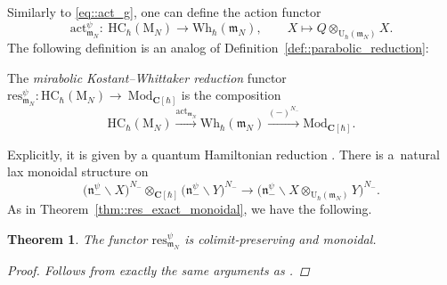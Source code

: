 \documentclass[10pt,a4paper]{article}
\numberwithin{equation}{section}
\newtheorem{Theorem}{Theorem}[section]
\newcommand{\C}{\mathbf{C}}
\newcommand{\U}{\mathrm{U}_{\hbar}}
\newcommand{\rM}{\mathrm{M}}
\newcommand{\n}{\mathfrak{n}}
\newcommand{\m}{\mathfrak{m}}
\newcommand{\Wh}{\mathrm{Wh}_{\hbar}}
\newcommand{\act}{\mathrm{act}}
\newcommand{\Mod}[1]{{\mathrm{Mod}}_{#1}}
\newcommand{\HC}{\mathrm{HC}_{\hbar}}
\newcommand{\res}{\mathrm{res}}
\begin{document}
	Similarly to \eqref{eq::act_g}, one can define the action functor
	\[
	\act_{\m_N}^{\psi}\colon\ \HC(\rM_N) \rightarrow \Wh(\m_N), \qquad X \mapsto Q \otimes_{\U(\m_N)} X.
	\]
	The following definition is an analog of Definition~\ref{def::parabolic_reduction}:
	\begin{Definition}
		The \emph{mirabolic Kostant--Whittaker reduction} functor $\res_{\m_N}^{\psi}  \colon  \HC(\rM_N)  \rightarrow \ \allowbreak\Mod{\C[\hbar]}$ is the composition
		\[
		\HC(\rM_N) \xrightarrow{\act_{\m_N}} \Wh(\m_N) \xrightarrow{(-)^{N_-}} \Mod{\C[\hbar]}.
		\]
	\end{Definition}
	
	Explicitly, it is given by a quantum Hamiltonian reduction \smash{$X \mapsto \bigl(\n_-^{\psi} \backslash X\bigr)^{N_-}$}. There is a~natural lax monoidal structure on \smash{$\res_{\m_N}^{\psi}$}
	\[
	\bigl(\n_-^{\psi} \backslash X\bigr)^{N_-} \otimes_{\C[\hbar]} \bigl(\n_-^{\psi} \backslash Y\bigr)^{N_-} \rightarrow \bigl(\n_-^{\psi} \backslash X\otimes_{\U(\m_N)} Y\bigr)^{N_-}.
	\]
	As in Theorem~\ref{thm::res_exact_monoidal}, we have the following.
	\begin{Theorem}
		The functor $\res_{\m_N}^{\psi}$ is colimit-preserving and monoidal.
		\begin{proof}
			Follows from exactly the same arguments as \cite[Corollary 4.18]{KalmykovSafronov}.
		\end{proof}
	\end{Theorem}
	
\end{document}
